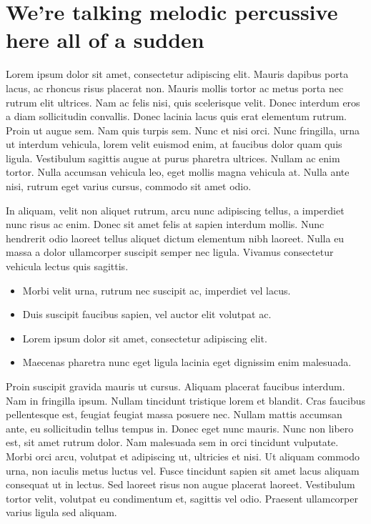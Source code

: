 \documentclass{article}
\begin{document}
\section{We're talking melodic percussive here all of a sudden}\hypertarget{were-talking-melodic-percussive-here-all-of-a-sudden}{}\label{were-talking-melodic-percussive-here-all-of-a-sudden}

Lorem ipsum dolor sit amet, consectetur adipiscing elit. Mauris dapibus porta lacus, ac rhoncus risus placerat non. Mauris mollis tortor ac metus porta nec rutrum elit ultrices. Nam ac felis nisi, quis scelerisque velit. Donec interdum eros a diam sollicitudin convallis. Donec lacinia lacus quis erat elementum rutrum. Proin ut augue sem. Nam quis turpis sem. Nunc et nisi orci. Nunc fringilla, urna ut interdum vehicula, lorem velit euismod enim, at faucibus dolor quam quis ligula. Vestibulum sagittis augue at purus pharetra ultrices. Nullam ac enim tortor. Nulla accumsan vehicula leo, eget mollis magna vehicula at. Nulla ante nisi, rutrum eget varius cursus, commodo sit amet odio.

In aliquam, velit non aliquet rutrum, arcu nunc adipiscing tellus, a imperdiet nunc risus ac enim. Donec sit amet felis at sapien interdum mollis. Nunc hendrerit odio laoreet tellus aliquet dictum elementum nibh laoreet. Nulla eu massa a dolor ullamcorper suscipit semper nec ligula. Vivamus consectetur vehicula lectus quis sagittis.

\begin{itemize}
\item Morbi velit urna, rutrum nec suscipit ac, imperdiet vel lacus.
\item Duis suscipit faucibus sapien, vel auctor elit volutpat ac.
\item Lorem ipsum dolor sit amet, consectetur adipiscing elit.
\item Maecenas pharetra nunc eget ligula lacinia eget dignissim enim malesuada.
\end{itemize}

Proin suscipit gravida mauris ut cursus. Aliquam placerat faucibus interdum. Nam in fringilla ipsum. Nullam tincidunt tristique lorem et blandit. Cras faucibus pellentesque est, feugiat feugiat massa posuere nec. Nullam mattis accumsan ante, eu sollicitudin tellus tempus in. Donec eget nunc mauris. Nunc non libero est, sit amet rutrum dolor. Nam malesuada sem in orci tincidunt vulputate. Morbi orci arcu, volutpat et adipiscing ut, ultricies et nisi. Ut aliquam commodo urna, non iaculis metus luctus vel. Fusce tincidunt sapien sit amet lacus aliquam consequat ut in lectus. Sed laoreet risus non augue placerat laoreet. Vestibulum tortor velit, volutpat eu condimentum et, sagittis vel odio. Praesent ullamcorper varius ligula sed aliquam.
\end{document}
